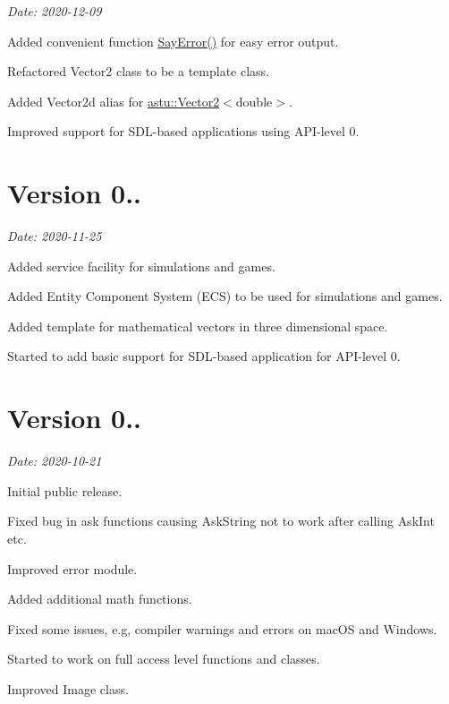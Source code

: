 {\itshape Date\+: 2020-\/12-\/09}


\begin{DoxyItemize}
\item Added convenient function {\ttfamily \hyperlink{group__io__group_gaa8fd8044fbf35d58e73087b6399cd82a}{Say\+Error()}} for easy error output.
\item Refactored {\ttfamily Vector2} class to be a template class.
\item Added {\ttfamily Vector2d} alias for {\ttfamily \hyperlink{classastu_1_1Vector2}{astu\+::\+Vector2}$<$double$>$}.
\item Improved support for S\+D\+L-\/based applications using A\+P\+I-\/level 0.
\end{DoxyItemize}

\section*{Version 0..}

{\itshape Date\+: 2020-\/11-\/25}


\begin{DoxyItemize}
\item Added service facility for simulations and games.
\item Added Entity Component System (E\+CS) to be used for simulations and games.
\item Added template for mathematical vectors in three dimensional space.
\item Started to add basic support for S\+D\+L-\/based application for A\+P\+I-\/level 0.
\end{DoxyItemize}

\section*{Version 0..}

{\itshape Date\+: 2020-\/10-\/21}


\begin{DoxyItemize}
\item Initial public release.
\item Fixed bug in ask functions causing {\ttfamily Ask\+String} not to work after calling {\ttfamily Ask\+Int} etc.
\item Improved error module.
\item Added additional math functions.
\item Fixed some issues, e.\+g, compiler warnings and errors on mac\+OS and Windows.
\item Started to work on full access level functions and classes.
\item Improved Image class.
\end{DoxyItemize}

